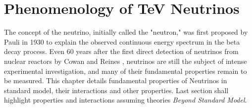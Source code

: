 \chapter{Phenomenology of TeV Neutrinos}
The concept of the neutrino, initially called the "neutron," was first proposed by Pauli in 1930  to explain the observed continuous energy spectrum in the beta decay process. Even 60 years after the first direct detection of neutrinos from nuclear reactors by Cowan and Reines , neutrinos are still the subject of intense experimental investigation, and many of their fundamental properties remain to be measured. This chapter details fundamental properties of Neutrinos in standard model, their interactions and other properties. Last section shall highlight properties and interactions assuming theories \emph{Beyond Standard Model}.
